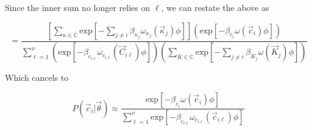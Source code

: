 \documentclass[11pt]{article} %
\begin{document}
Since the inner sum no longer relies on $\ell$, we can restate the above as 

\[
=
\frac{
\left[
\sum _{\kappa \in \mathbb{C}}
\mbox{exp}\left[-\sum_{j\neq i} \beta_{\kappa_j} \omega_{\kappa_j} (\vec{\kappa}_j) \phi \right]
\right]
\left(\mbox{exp}\left[-\beta_{c_i} \omega (\vec{c}_i) \phi \right]\right)
}{
\sum_{\ell=1}^\nu
\left(
\mbox{exp}\left[-\beta_{c_{i\ell}} \omega_{c_{i\ell}} (\vec{C}_{i\ell}) \phi \right]
\right)\left(
\sum _{K \in \mathbb{C}}
\mbox{exp}\left[-\sum_{j\neq i} \beta_{K_j} \omega (\vec{K}_j) \phi \right]
\right)
}
\]


Which cancels to


\[
P(\vec{c}_i | \vec{\theta})
\approx
\frac{
\mbox{exp}\left[-\beta_{c_i} \omega (\vec{c}_i) \phi \right]
}{
\sum_{\ell=1}^\nu
\mbox{exp}\left[-\beta_{c_{i\ell}} \omega_{c_{i\ell}} (\vec{c}_{i\ell}) \phi \right]
}
\]

%
\end{document}
